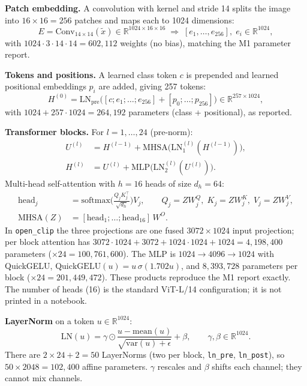 \documentclass[10pt,a4paper]{article}
\begin{document}
\textbf{Patch embedding.} A convolution with kernel and stride 14 splits the image into
\(16\times16=256\) patches and maps each to 1024 dimensions:
\begin{equation}
E=\mathrm{Conv}_{14\times14}(\tilde x)\in\mathbb{R}^{1024\times16\times16}\;\Rightarrow\;
[e_1,\dots,e_{256}],\; e_i\in\mathbb{R}^{1024},
\end{equation}
with \(1024\cdot3\cdot14\cdot14=602{,}112\) weights (no bias), matching the M1 parameter report.

\textbf{Tokens and positions.} A learned class token \(c\) is prepended and learned positional
embeddings \(p_i\) are added, giving 257 tokens:
\begin{equation}
H^{(0)}=\mathrm{LN}_\text{pre}\big([c;e_1;\dots;e_{256}]+[p_0;\dots;p_{256}]\big)\in\mathbb{R}^{257\times1024},
\end{equation}
with \(1024+257\cdot1024=264{,}192\) parameters (class + positional), as reported.

\textbf{Transformer blocks.} For \(l=1,\dots,24\) (pre-norm):
\begin{align}
U^{(l)}&=H^{(l-1)}+\mathrm{MHSA}\big(\mathrm{LN}_1^{(l)}(H^{(l-1)})\big),\\
H^{(l)}&=U^{(l)}+\mathrm{MLP}\big(\mathrm{LN}_2^{(l)}(U^{(l)})\big).
\end{align}
Multi-head self-attention with \(h=16\) heads of size \(d_h=64\):
\begin{align}
\mathrm{head}_j&=\mathrm{softmax}\!\Big(\frac{Q_jK_j^\top}{\sqrt{d_h}}\Big)V_j,\qquad
Q_j=ZW^Q_j,\;K_j=ZW^K_j,\;V_j=ZW^V_j,\\
\mathrm{MHSA}(Z)&=[\mathrm{head}_1;\dots;\mathrm{head}_{16}]\,W^O .
\end{align}
In \texttt{open\_clip} the three projections are one fused \(3072\times1024\) input projection; per
block attention has \(3072\cdot1024+3072+1024\cdot1024+1024=4{,}198{,}400\) parameters
(\(\times24=100{,}761{,}600\)). The MLP is \(1024\to4096\to1024\) with QuickGELU,
\(\mathrm{QuickGELU}(u)=u\,\sigma(1.702u)\), and \(8{,}393{,}728\) parameters per block
(\(\times24=201{,}449{,}472\)). These products reproduce the M1 report exactly. The number of heads
(16) is the standard ViT-L/14 configuration; it is not printed in a notebook.

\textbf{LayerNorm} on a token \(u\in\mathbb{R}^{1024}\):
\begin{equation}\label{eq:ln}
\mathrm{LN}(u)=\gamma\odot\frac{u-\mathrm{mean}(u)}{\sqrt{\mathrm{var}(u)+\epsilon}}+\beta,\qquad\gamma,\beta\in\mathbb{R}^{1024}.
\end{equation}
There are \(2\times24+2=50\) LayerNorms (two per block, \texttt{ln\_pre}, \texttt{ln\_post}), so
\(50\times2048=102{,}400\) affine parameters. \(\gamma\) rescales and \(\beta\) shifts each channel; they
cannot mix channels.
\end{document}
